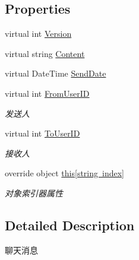 \subsection*{Properties}
\begin{DoxyCompactItemize}
\item 
virtual int \mbox{\hyperlink{class_t_net_1_1_model_1_1_chat_message_ac54fb3fe96642abd8c1a4802f5bbd1a6}{Version}}
\item 
virtual string \mbox{\hyperlink{class_t_net_1_1_model_1_1_chat_message_a7a36183eb616dd184cedc256582713cd}{Content}}
\item 
virtual Date\+Time \mbox{\hyperlink{class_t_net_1_1_model_1_1_chat_message_a70cef0a01eaa288c402dd59000ef88f1}{Send\+Date}}
\item 
virtual int \mbox{\hyperlink{class_t_net_1_1_model_1_1_chat_message_a1ecb8c31449a3ba689a6ad64062c8a45}{From\+User\+ID}}
\begin{DoxyCompactList}\small\item\em 发送人 \end{DoxyCompactList}\item 
virtual int \mbox{\hyperlink{class_t_net_1_1_model_1_1_chat_message_aefc99b5bdaf6e2737f1417b8d79f17be}{To\+User\+ID}}
\begin{DoxyCompactList}\small\item\em 接收人 \end{DoxyCompactList}\item 
override object \mbox{\hyperlink{class_t_net_1_1_model_1_1_chat_message_acab9a1e4bbbe4f5808439c1fe9c3a154}{this\mbox{[}string index\mbox{]}}}
\begin{DoxyCompactList}\small\item\em 对象索引器属性 \end{DoxyCompactList}\end{DoxyCompactItemize}


\subsection{Detailed Description}
聊天消息 



